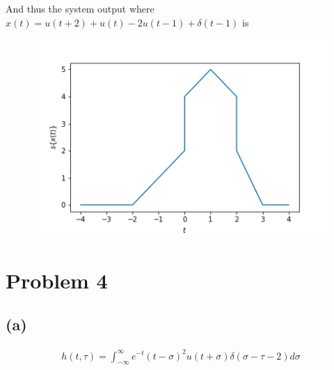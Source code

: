 \documentclass[12pt]{article}
\begin{document}
And thus the system output where $x(t)=u(t+2)+u(t)-2u(t-1)+\delta(t-1)$ is
\begin{figure}[h!]
\includegraphics[scale=0.3]{fig3c2}
\centering
\end{figure}
\section*{Problem 4}
\subsection*{(a)}
\begin{align*}
h(t,\tau)=\int_{-\infty}^{\infty}e^{-t}(t-\sigma)^2u(t+\sigma)\delta(\sigma-\tau-2)d\sigma
\end{align*}
\end{document}
